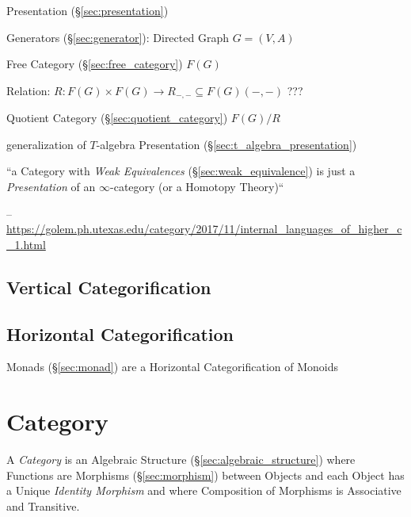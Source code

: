 Presentation (\S\ref{sec:presentation})

Generators (\S\ref{sec:generator}): Directed Graph $G = (V,A)$

Free Category (\S\ref{sec:free_category}) $F(G)$

Relation: $R : F(G) \times F(G) \rightarrow R_{-,-} \subseteq
F(G)(-,-)$ ??? %

Quotient Category (\S\ref{sec:quotient_category}) $F(G) / R$

generalization of $T$-algebra Presentation
(\S\ref{sec:t_algebra_presentation})

``a Category with \emph{Weak Equivalences} (\S\ref{sec:weak_equivalence}) is
just a \emph{Presentation} of an $\infty$-category (or a Homotopy Theory)``

--\url{https://golem.ph.utexas.edu/category/2017/11/internal_languages_of_higher_c_1.html}



\subsection{Vertical Categorification}
\label{sec:vertical_categorification}

\subsection{Horizontal Categorification}
\label{sec:horizontal_categorification}

Monads (\S\ref{sec:monad}) are a Horizontal Categorification of
Monoids



\section{Category}\label{sec:category}

A \emph{Category} is an Algebraic Structure
(\S\ref{sec:algebraic_structure}) where Functions are Morphisms
(\S\ref{sec:morphism}) between Objects and each Object has a Unique
\emph{Identity Morphism} and where Composition of Morphisms is
Associative and Transitive.

